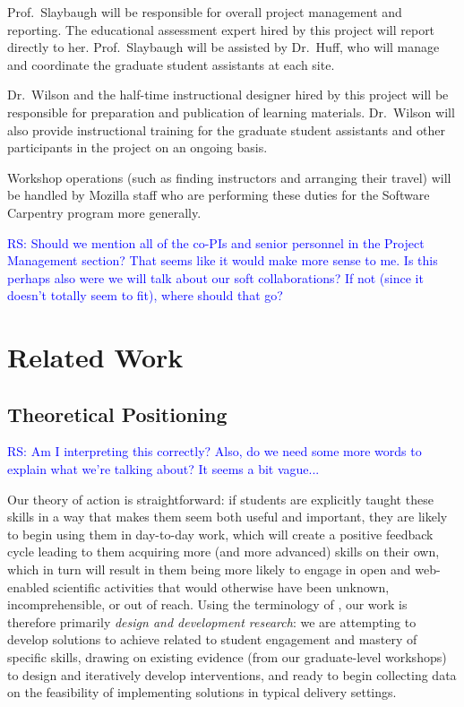 \documentclass{proposalnsf}
\newcommand{\comment}[1]{\textcolor{blue}{ #1 }}
\begin{document}
Prof.\ Slaybaugh will be responsible for overall project management
and reporting.  The educational assessment expert hired by this
project will report directly to her.  Prof.\ Slaybaugh will be
assisted by Dr.\ Huff, who will manage and coordinate the graduate
student assistants at each site.

Dr.\ Wilson and the half-time instructional designer hired by this
project will be responsible for preparation and publication of
learning materials.  Dr.\ Wilson will also provide instructional
training for the graduate student assistants and other participants in
the project on an ongoing basis.

Workshop operations (such as finding instructors and arranging their
travel) will be handled by Mozilla staff who are performing these
duties for the Software Carpentry program more generally.

\comment{RS: Should we mention all of the co-PIs and senior personnel in the Project Management section? That seems like it would make more sense to me. Is this perhaps also were we will talk about our soft collaborations? If not (since it doesn't totally seem to fit), where should that go?}

\section{Related Work}

\subsection{Theoretical Positioning}

\comment{RS: Am I interpreting this correctly? Also, do we need some more words to explain what we're talking about? It seems a bit vague...}

Our theory of action is straightforward: if students are explicitly
taught these skills in a way that makes them seem both useful and
important, they are likely to begin using them in day-to-day work,
which will create a positive feedback cycle leading to them acquiring
more (and more advanced) skills on their own, which in turn will
result in them being more likely to engage in open and web-enabled
scientific activities that would otherwise have been unknown,
incomprehensible, or out of reach.  Using the terminology of
\cite{guidelines}, our work is therefore primarily \emph{design and
  development research}: we are attempting to develop solutions to
achieve related to student engagement and mastery of specific skills,
drawing on existing evidence (from our graduate-level workshops) to
design and iteratively develop interventions, and ready to begin
collecting data on the feasibility of implementing solutions in
typical delivery settings.
\end{document}
